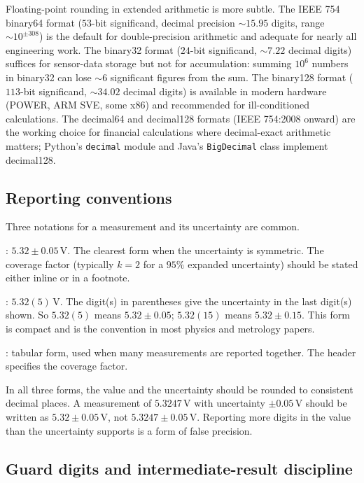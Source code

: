 Floating-point rounding in extended arithmetic is more subtle.
The IEEE 754 binary64 format ($53$-bit significand, decimal
precision $\sim 15.95$ digits, range $\sim 10^{\pm 308}$) is the
default for double-precision arithmetic and adequate for nearly
all engineering work. The binary32 format ($24$-bit significand,
$\sim 7.22$ decimal digits) suffices for sensor-data storage but
not for accumulation: summing $10^{6}$ numbers in binary32 can
lose $\sim 6$ significant figures from the sum. The binary128
format ($113$-bit significand, $\sim 34.02$ decimal digits) is
available in modern hardware (POWER, ARM SVE, some x86) and
recommended for ill-conditioned calculations. The decimal64 and
decimal128 formats (IEEE 754:2008 onward) are the working choice
for financial calculations where decimal-exact arithmetic matters;
Python's \texttt{decimal} module and Java's \texttt{BigDecimal}
class implement decimal128.

\subsection{Reporting conventions}

Three notations for a measurement and its uncertainty are common.

: $5.32 \pm 0.05 \,\si
{\volt}$. The clearest form when the uncertainty is symmetric. The
coverage factor (typically $k = 2$ for a $95\%$ expanded
uncertainty) should be stated either inline or in a footnote.

: $5.32(5) \,\si
{\volt}$. The digit(s) in parentheses give the uncertainty in the
last digit(s) shown. So $5.32(5)$ means $5.32 \pm 0.05$;
$5.32(15)$ means $5.32 \pm 0.15$. This form is compact and is the
convention in most physics and metrology papers.

: tabular form, used
when many measurements are reported together. The header specifies
the coverage factor.

In all three forms, the value and the uncertainty should be rounded
to consistent decimal places. A measurement of $5.3247 \,\si{\volt}$
with uncertainty $\pm 0.05 \,\si{\volt}$ should be written as
$5.32 \pm 0.05 \,\si{\volt}$, not $5.3247 \pm 0.05 \,\si{\volt}$.
Reporting more digits in the value than the uncertainty supports is
a form of false precision.

\subsection{Guard digits and intermediate-result discipline}


